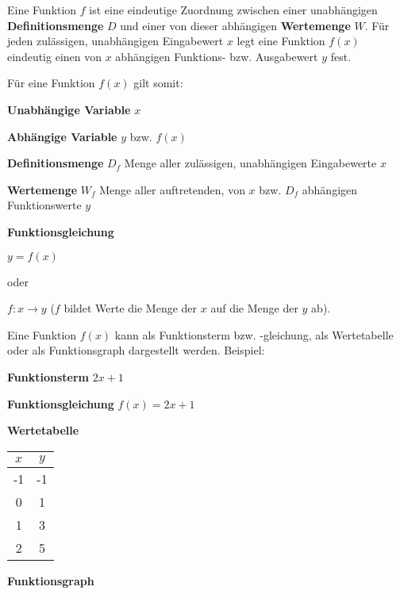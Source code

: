 



\thispagestyle{plain}



Eine Funktion $f$ ist eine eindeutige Zuordnung zwischen einer unabh\"{a}ngigen \textbf{Definitionsmenge} $D$ und einer von dieser abh\"{a}ngigen \textbf{Wertemenge} $W$. F\"{u}r jeden zul\"{a}ssigen, unabh\"{a}ngigen Eingabewert $x$ legt eine Funktion $f(x)$ eindeutig einen von $x$ abh\"{a}ngigen Funktions- bzw. Ausgabewert $y$ fest.

F\"{u}r eine Funktion $f(x)$ gilt somit:

\textbf{Unabh\"{a}ngige Variable}  $x$

\textbf{Abh\"{a}ngige Variable}  $y$ bzw. $f(x)$

\textbf{Definitionsmenge} $D_{f}$  Menge aller zul\"{a}ssigen, unabh\"{a}ngigen Eingabewerte $x$

\textbf{Wertemenge} $W_{f}$  Menge aller auftretenden, von $x$ bzw. $D_{f}$ abh\"{a}ngigen Funktionswerte $y$

\textbf{Funktionsgleichung} 

$y = f(x)$

oder

$f: x \rightarrow y$ ($f$ bildet Werte die Menge der $x$ auf die Menge der $y$ ab).


Eine Funktion $f(x)$ kann als Funktionsterm bzw. -gleichung, als Wertetabelle oder als Funktionsgraph dargestellt werden. Beispiel:

\begin{multicols}{2}

\textbf{Funktionsterm}  $2x + 1$

\textbf{Funktionsgleichung}  $f(x) = 2x + 1$

\textbf{Wertetabelle} 
\begin{tabular}{c | c}

	$x$ & $y$
	\\ \hline
	-1 & -1
	\\
	0 & 1
	\\
	1 & 3
	\\
	2 & 5

\end{tabular}


\begin{center}\textbf{Funktionsgraph}\end{center}

\end{multicols}

